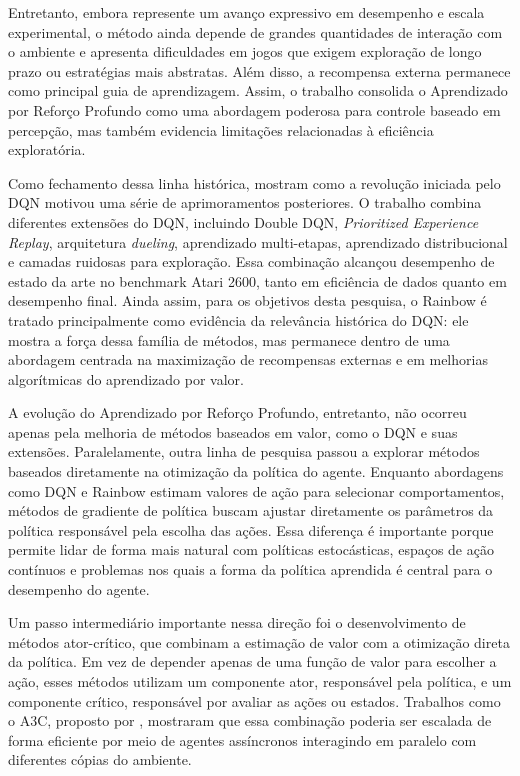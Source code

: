 Entretanto, embora  represente um avanço expressivo em desempenho e escala experimental, o método ainda depende de grandes quantidades de interação com o ambiente e apresenta dificuldades em jogos que exigem exploração de longo prazo ou estratégias mais abstratas. Além disso, a recompensa externa permanece como principal guia de aprendizagem. Assim, o trabalho consolida o Aprendizado por Reforço Profundo como uma abordagem poderosa para controle baseado em percepção, mas também evidencia limitações relacionadas à eficiência exploratória.

Como fechamento dessa linha histórica,  mostram como a revolução iniciada pelo DQN motivou uma série de aprimoramentos posteriores. O trabalho combina diferentes extensões do DQN, incluindo Double DQN, \textit{Prioritized Experience Replay}, arquitetura \textit{dueling}, aprendizado multi-etapas, aprendizado distribucional e camadas ruidosas para exploração. Essa combinação alcançou desempenho de estado da arte no benchmark Atari 2600, tanto em eficiência de dados quanto em desempenho final. Ainda assim, para os objetivos desta pesquisa, o Rainbow é tratado principalmente como evidência da relevância histórica do DQN: ele mostra a força dessa família de métodos, mas permanece dentro de uma abordagem centrada na maximização de recompensas externas e em melhorias algorítmicas do aprendizado por valor.

A evolução do Aprendizado por Reforço Profundo, entretanto, não ocorreu apenas pela melhoria de métodos baseados em valor, como o DQN e suas extensões. Paralelamente, outra linha de pesquisa passou a explorar métodos baseados diretamente na otimização da política do agente. Enquanto abordagens como DQN e Rainbow estimam valores de ação para selecionar comportamentos, métodos de gradiente de política buscam ajustar diretamente os parâmetros da política responsável pela escolha das ações. Essa diferença é importante porque permite lidar de forma mais natural com políticas estocásticas, espaços de ação contínuos e problemas nos quais a forma da política aprendida é central para o desempenho do agente.

Um passo intermediário importante nessa direção foi o desenvolvimento de métodos ator-crítico, que combinam a estimação de valor com a otimização direta da política. Em vez de depender apenas de uma função de valor para escolher a ação, esses métodos utilizam um componente ator, responsável pela política, e um componente crítico, responsável por avaliar as ações ou estados. Trabalhos como o A3C, proposto por , mostraram que essa combinação poderia ser escalada de forma eficiente por meio de agentes assíncronos interagindo em paralelo com diferentes cópias do ambiente.

